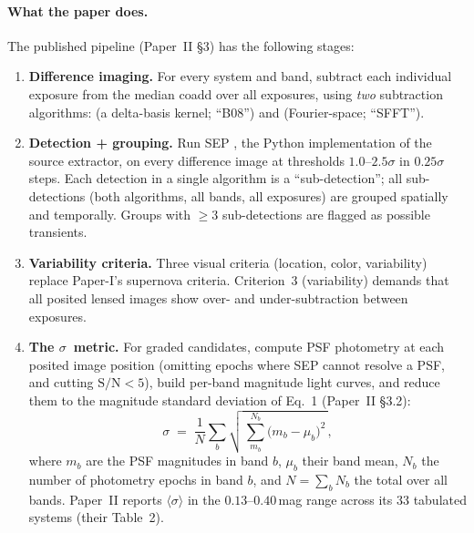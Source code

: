 \documentclass[11pt,letterpaper]{article}
\newcommand{\sig}{\ensuremath{\sigma}}
\newcommand{\meansig}{\ensuremath{\langle\sigma\rangle}}
\begin{document}
\paragraph{What the paper does.} The published pipeline (Paper~II \S3) has the
following stages:
\begin{enumerate}
\item \textbf{Difference imaging.} For every system and band, subtract each
      individual exposure from the median coadd over all exposures, using
      \emph{two} subtraction algorithms: \citet{bramich2008} (a delta-basis
      kernel; ``B08'') and \citet{hu2022sfft} (Fourier-space; ``SFFT'').
\item \textbf{Detection + grouping.} Run SEP \autocite{barbary2018sep}, the
      Python implementation of the \citet{bertin1996sextractor} source
      extractor, on every difference image at thresholds $1.0$--$2.5\sigma$ in
      $0.25\sigma$ steps. Each detection in a single algorithm is a
      ``sub-detection''; all sub-detections (both algorithms, all bands, all
      exposures) are grouped spatially and temporally. Groups with
      $\geq 3$ sub-detections are flagged as possible transients.
\item \textbf{Variability criteria.} Three visual criteria
      (location, color, variability) replace Paper-I's supernova criteria.
      Criterion~3 (variability) demands that all posited lensed images show
      over- and under-subtraction between exposures.
\item \textbf{The \sig\ metric.} For graded candidates, compute PSF photometry
      at each posited image position (omitting epochs where SEP cannot resolve
      a PSF, and cutting $\mathrm{S/N} < 5$), build per-band magnitude light
      curves, and reduce them to the magnitude standard deviation of Eq.~1
      (Paper~II \S3.2):
      \begin{equation}
        \sigma \;=\; \frac{1}{N}\sum_{b}
                     \sqrt{\,\sum_{m_b}^{N_b}\bigl(m_b-\mu_b\bigr)^2 \,},
        \label{eq:sigma}
      \end{equation}
      where $m_b$ are the PSF magnitudes in band $b$, $\mu_b$ their band mean,
      $N_b$ the number of photometry epochs in band $b$, and
      $N=\sum_b N_b$ the total over all bands. Paper~II reports $\meansig$ in
      the $0.13$--$0.40$\,mag range across its $33$ tabulated systems
      (their Table~2).
\end{enumerate}
\end{document}
